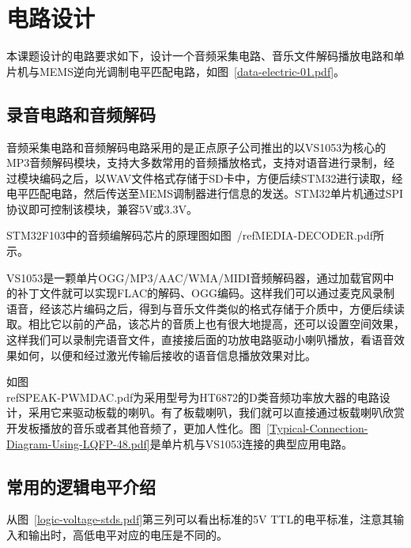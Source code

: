 \chapter{电路设计}
本课题设计的电路要求如下，设计一个音频采集电路、音乐文件解码播放电路和单片机与MEMS逆向光调制电平匹配电路，如图~\ref{data-electric-01.pdf}。
\section{录音电路和音频解码}
音频采集电路和音频解码电路采用的是正点原子公司推出的以VS1053为核心的MP3音频解码模块，支持大多数常用的音频播放格式，支持对语音进行录制，经过模块编码之后，以WAV文件格式存储于SD卡中，方便后续STM32进行读取，经电平匹配电路，然后传送至MEMS调制器进行信息的发送。STM32单片机通过SPI协议即可控制该模块，兼容5V或3.3V。


STM32F103中的音频编解码芯片的原理图如图~/ref{MEDIA-DECODER.pdf}所示。

VS1053是一颗单片OGG/MP3/AAC/WMA/MIDI音频解码器，通过加载官网中的补丁文件就可以实现FLAC的解码、OGG编码。这样我们可以通过麦克风录制语音，经该芯片编码之后，得到与音乐文件类似的格式存储于介质中，方便后续读取。相比它以前的产品，该芯片的音质上也有很大地提高，还可以设置空间效果，这样我们可以录制完语音文件，直接接后面的功放电路驱动小喇叭播放，看语音效果如何，以便和经过激光传输后接收的语音信息播放效果对比。






如图~\\ref{SPEAK-PWMDAC.pdf}为采用型号为HT6872的D类音频功率放大器的电路设计，采用它来驱动板载的喇叭。有了板载喇叭，我们就可以直接通过板载喇叭欣赏开发板播放的音乐或者其他音频了，更加人性化。图~\ref{Typical-Connection-Diagram-Using-LQFP-48.pdf}是单片机与VS1053连接的典型应用电路。




\section{常用的逻辑电平介绍}
从图~\ref{logic-voltage-stds.pdf}第三列可以看出标准的5V TTL的电平标准，注意其输入和输出时，高低电平对应的电压是不同的。



